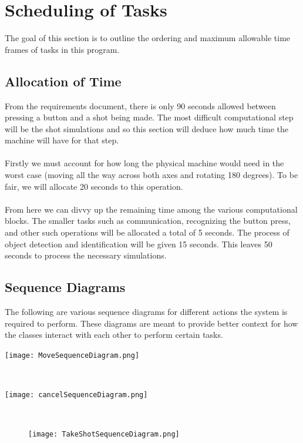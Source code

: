 \documentclass[titlepage]{article}
\begin{document}
\section{Scheduling of Tasks}
The goal of this section is to outline the ordering and maximum allowable time frames of tasks in this program.
\subsection{Allocation of Time}
From the requirements document, there is only 90 seconds allowed between pressing a button and a shot being made. The most difficult computational step will be the shot simulations and so this section will deduce how much time the machine will have for that step.\\~\\
Firstly we must account for how long the physical machine would need in the worst case (moving all the way across both axes and rotating 180 degrees). To be fair, we will allocate 20 seconds to this operation.\\~\\
From here we can divvy up the remaining time among the various computational blocks. The smaller tasks such as communication, recognizing the button press, and other such operations will be allocated a total of 5 seconds. The process of object detection and identification will be given 15 seconds. This leaves 50 seconds to process the necessary simulations.
\newpage

\subsection{Sequence Diagrams}
The following are various sequence diagrams for different actions the system is required to perform. These diagrams are meant to provide better context for how the classes interact with each other to perform certain tasks.\vfill
\begin{center}
	\texttt{[image: MoveSequenceDiagram.png]}
\label{fig:MoveSequenceDiagram}
\end{center}
~\vfill
\begin{center}
	\texttt{[image: cancelSequenceDiagram.png]}
\label{fig:CancelSequenceDiagram}
\end{center}
~\vfill

\begin{figure}
	\begin{center}
		\texttt{[image: TakeShotSequenceDiagram.png]}
	\label{fig:TakeShotSequenceDiagram}
	\end{center}
\end{figure}
\end{document}
